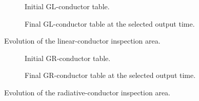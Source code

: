 \begin{figure}[!htbp]
    \centering

    \begin{subfigure}[t]{0.96\textwidth}
        \centering
        \caption{Initial GL-conductor table.}
        \label{fig:appendix_original_gl_conductors}
    \end{subfigure}

    \vspace{0.8em}

    \begin{subfigure}[t]{0.96\textwidth}
        \centering
        \caption{Final GL-conductor table at the selected output time.}
        \label{fig:appendix_final_gl_conductors}
    \end{subfigure}

    \caption{Evolution of the linear-conductor inspection area.}
    \label{fig:appendix_gl_conductors_evolution}
\end{figure}

\FloatBarrier

\begin{figure}[!htbp]
    \centering

    \begin{subfigure}[t]{0.96\textwidth}
        \centering
        \caption{Initial GR-conductor table.}
        \label{fig:appendix_original_gr_conductors}
    \end{subfigure}

    \vspace{0.8em}

    \begin{subfigure}[t]{0.96\textwidth}
        \centering
        \caption{Final GR-conductor table at the selected output time.}
        \label{fig:appendix_final_gr_conductors}
    \end{subfigure}

    \caption{Evolution of the radiative-conductor inspection area.}
    \label{fig:appendix_gr_conductors_evolution}
\end{figure}

